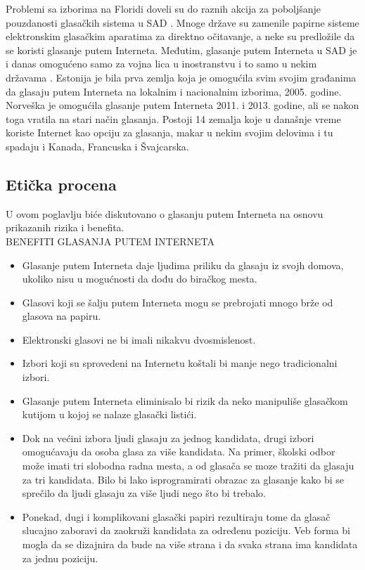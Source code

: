 \documentclass[a4paper]{article}
\theoremstyle{break}
\begin{document}
{Problemi sa izborima na Floridi doveli su do raznih akcija za poboljšanje pouzdanosti glasačkih sistema u SAD \cite{knjiga}. Mnoge države su zamenile papirne sisteme elektronskim glasačkim aparatima za direktno očitavanje, a neke su predložile da se koristi glasanje putem Interneta.
Međutim, glasanje putem Interneta u SAD je i danas omogućeno samo za vojna lica u inostranstvu i to samo u nekim državama \cite{i_voting}. Estonija je bila prva zemlja koja je omogućila svim svojim građanima da glasaju putem Interneta na lokalnim i nacionalnim izborima, 2005. godine. 
Norveška je omogućila glasanje putem Interneta 2011. i 2013. godine, ali se nakon toga vratila na stari način glasanja. Postoji 14 zemalja koje u današnje vreme koriste Internet kao opciju za glasanja, makar u nekim svojim delovima i tu spadaju i Kanada, Francuska i Švajcarska.

\subsection{Etička procena}
\label{subsec:Eticka procena}

U ovom poglavlju biće diskutovano o glasanju putem Interneta na osnovu prikazanih rizika i benefita.\\

\noindent BENEFITI GLASANJA PUTEM INTERNETA
\begin{itemize}
\item Glasanje putem Interneta daje ljudima priliku da glasaju iz svojh domova, ukoliko nisu u mogućnosti da dođu do biračkog mesta.
\item Glasovi koji se šalju putem Interneta mogu se prebrojati mnogo brže od glasova na papiru.
\item Elektronski glasovi ne bi imali nikakvu dvosmislenost.
\item Izbori koji su sprovedeni na Internetu koštali bi manje nego tradicionalni izbori.
\item Glasanje putem Interneta eliminisalo bi rizik da neko manipuliše glasačkom kutijom u kojoj se nalaze glasački listići.
\item Dok na većini izbora ljudi glasaju za jednog kandidata, drugi izbori omogućavaju da osoba glasa za više kandidata. Na primer, školski odbor može imati tri slobodna radna mesta, a od glasača se moze tražiti da glasaju za tri kandidata. Bilo bi lako isprogramirati obrazac za glasanje kako bi se sprečilo da ljudi glasaju za više ljudi nego što bi trebalo.
\item Ponekad, dugi i komplikovani glasački papiri rezultiraju tome da glasač slucajno zaboravi da zaokruži kandidata za određenu poziciju. Veb forma bi mogla da se dizajnira da bude na više strana i da svaka strana ima kandidata za jednu poziciju.
\end{itemize}


}
\end{document}
